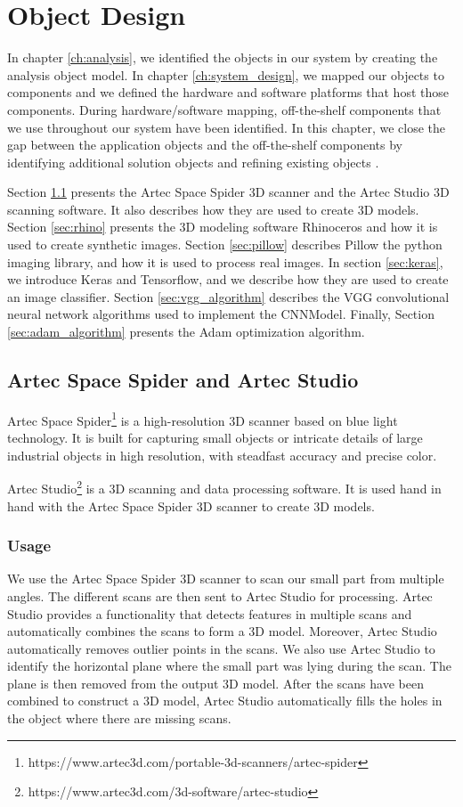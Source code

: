 \chapter{Object Design}\label{ch:object_design}
In chapter \ref{ch:analysis}, we identified the objects in our system by creating the analysis object model. In chapter \ref{ch:system_design}, we mapped our objects to components and we defined the hardware and software platforms that host those components. During hardware/software mapping, off-the-shelf components that we use throughout our system have been identified. In this chapter, we close the gap between the application objects and the off-the-shelf components by identifying additional solution objects and refining existing objects \cite{bruegge2004object}.

Section \ref{sec:artec} presents the Artec Space Spider 3D scanner and the Artec Studio 3D scanning software. It also describes how they are used to create 3D models. Section \ref{sec:rhino} presents the 3D modeling software Rhinoceros and how it is used to create synthetic images. Section \ref{sec:pillow} describes Pillow the python imaging library, and how it is used to process real images. In section \ref{sec:keras}, we introduce Keras and Tensorflow, and we describe how they are used to create an image classifier. Section \ref{sec:vgg_algorithm} describes the VGG convolutional neural network algorithms used to implement the CNNModel. Finally, Section \ref{sec:adam_algorithm} presents the Adam optimization algorithm.


\section{Artec Space Spider and Artec Studio}\label{sec:artec}
Artec Space Spider\footnote{https://www.artec3d.com/portable-3d-scanners/artec-spider} is a high-resolution 3D scanner based on blue light technology. It is built for capturing small objects or intricate details of large industrial objects in high resolution, with steadfast accuracy and precise color.

Artec Studio\footnote{https://www.artec3d.com/3d-software/artec-studio} is a 3D scanning and data processing software. It is used hand in hand with the Artec Space Spider 3D scanner to create 3D models.

\subsection{Usage}
We use the Artec Space Spider 3D scanner to scan our small part from multiple angles. The different scans are then sent to Artec Studio for processing. Artec Studio provides a functionality that detects features in multiple scans and automatically combines the scans to form a 3D model. Moreover, Artec Studio automatically removes outlier points in the scans. We also use Artec Studio to identify the horizontal plane where the small part was lying during the scan. The plane is then removed from the output 3D model. After the scans have been combined to construct a 3D model, Artec Studio automatically fills the holes in the object where there are missing scans.


